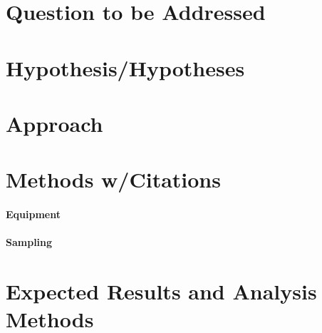 \documentclass{tufte-handout}
\begin{document}
\section{Question to be Addressed}

\section{Hypothesis/Hypotheses}

\section{Approach}

 

\section{Methods w/Citations}

\paragraph{Equipment}

\paragraph{Sampling}


\section{Expected Results and Analysis Methods}
\end{document}
